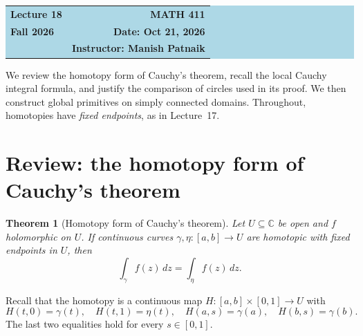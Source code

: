 \documentclass[11pt]{article}
\theoremstyle{plain}
\newtheorem{theorem}{Theorem}[section]
\theoremstyle{definition}
\theoremstyle{remark}
\numberwithin{equation}{section}
\newcommand{\C}{\mathbb{C}}
\begin{document}
\begin{center}
  \colorbox{lightblue}{%
    \begin{minipage}{0.94\textwidth}
      \vspace{0.55em}
      \begin{tabular*}{\textwidth}{@{\extracolsep{\fill}}lr}
        {\color{courseblue}\bfseries\LARGE Lecture 18} &
        {\color{courseblue}\bfseries\LARGE MATH 411}\\[0.35em]
        \textbf{Fall 2026} & \textbf{Date: Oct 21, 2026}\\
        & \textbf{Instructor: Manish Patnaik}
      \end{tabular*}
      \vspace{0.45em}
    \end{minipage}}
\end{center}

\setcounter{tocdepth}{1}
\tableofcontents
\vspace{0.45em}


We review the homotopy form of Cauchy's theorem, recall the local Cauchy
integral formula, and justify the comparison of circles used in its proof.
We then construct global primitives on simply connected domains.
Throughout, homotopies have \emph{fixed endpoints}, as in Lecture~17.

\section{Review: the homotopy form of Cauchy's theorem}
\begin{theorem}[Homotopy form of Cauchy's theorem]\label{thm:homotopy}
Let $U\subseteq\C$ be open and $f$ holomorphic on $U$.
If continuous curves $\gamma,\eta\colon[a,b]\to U$ are homotopic
with fixed endpoints in $U$, then
\[
 \boxed{\displaystyle\int_\gamma f(z)\,dz=\int_\eta f(z)\,dz.}
\]
\end{theorem}
Recall that the homotopy is a continuous map
$H\colon[a,b]\times[0,1]\to U$ with
\[
 H(t,0)=\gamma(t),\quad H(t,1)=\eta(t),\quad
 H(a,s)=\gamma(a),\quad H(b,s)=\gamma(b).
\]
The last two equalities hold for every $s\in[0,1]$.
\end{document}
